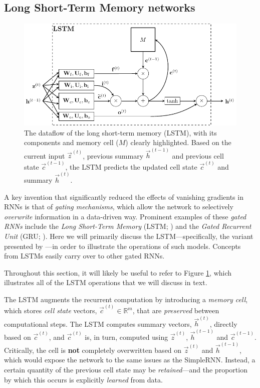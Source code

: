\subsection{Long Short-Term Memory networks}
\label{sec:lstm}

\begin{figure}
    \centering
    \includegraphics[width=\linewidth]{figures/lstm.pdf}
    \caption{The dataflow of the long short-term memory (LSTM), with its components and memory cell ($M$) clearly highlighted. Based on the current input $\vec{z}^{(t)}$, previous summary $\vec{h}^{(t-1)}$ and previous cell state $\vec{c}^{(t-1)}$, the LSTM predicts the updated cell state $\vec{c}^{(t)}$ and summary $\vec{h}^{(t)}$.}
    \label{fig:lstm}
\end{figure}
A key invention that significantly reduced the effects of vanishing gradients in RNNs is that of \emph{gating mechanisms}, which allow the network to selectively \emph{overwrite} information in a data-driven way. Prominent examples of these \emph{gated RNNs} include the {\em Long Short-Term Memory} (LSTM; \citet{hochreiter1997long}) and the {\em Gated Recurrent Unit} (GRU; \citet{cho2014learning}). Here we will primarily discuss the LSTM---specifically, the variant presented by \citet{graves2013generating}---in order to illustrate the operations of such models. Concepts from LSTMs easily carry over to other gated RNNs.

Throughout this section, it will likely be useful to refer to Figure \ref{fig:lstm}, which illustrates all of the LSTM operations that we will discuss in text.

The LSTM augments the recurrent computation by introducing a \emph{memory cell}, which stores \emph{cell state} vectors, $\vec{c}^{(t)}\in\mathbb{R}^m$, that are \emph{preserved} between computational steps. The LSTM computes summary vectors, $\vec{h}^{(t)}$, directly based on $\vec{c}^{(t)}$, and $\vec{c}^{(t)}$ is, in turn, computed using $\vec{z}^{(t)}$, $\vec{h}^{(t-1)}$ and $\vec{c}^{(t-1)}$.
Critically, the cell is \textbf{not} completely overwritten based on $\vec{z}^{(t)}$ and $\vec{h}^{(t-1)}$, which would expose the network to the same issues as the SimpleRNN. Instead, a certain quantity of the previous cell state may be \emph{retained}---and the proportion by which this occurs is explicitly \emph{learned} from data.

